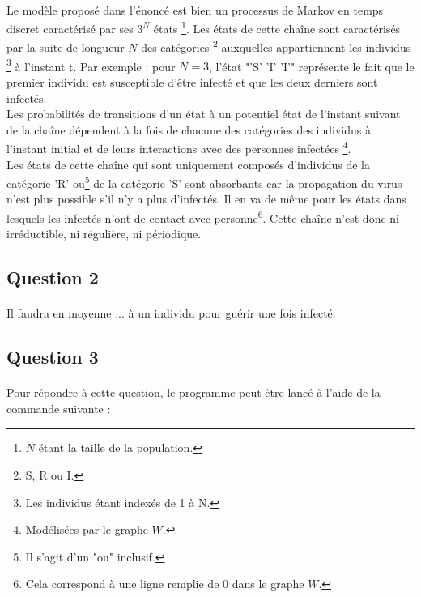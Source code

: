 \documentclass[a4paper, 12pt, oneside]{article}
\begin{document}
\paragraph{}Le modèle proposé dans l'énoncé est bien un processus de Markov en temps discret caractérisé par ses $3^N$ états \footnote{$N$ étant la taille de la population.}. Les états de cette chaîne sont caractérisés par la suite de longueur $N$ des catégories \footnote{S, R ou I.} auxquelles appartiennent les individus \footnote{Les individus étant indexés de 1 à N.} à l'instant t. Par exemple : pour $N = 3$, l'état "'S' 'I' 'I'" représente le fait que le premier individu est susceptible d'être infecté et que les deux derniers sont infectés.\\
\indent Les probabilités de transitions d'un état à un potentiel état de l'instant suivant de la chaîne dépendent à la fois de chacune des catégories des individus à l'instant initial et de leurs interactions avec des personnes infectées \footnote{Modélisées par le graphe $W$.}.\\
\indent Les états de cette chaîne qui sont uniquement composés d'individus de la catégorie 'R' ou\footnote{Il s'agit d'un "ou" inclusif.} de la catégorie 'S' sont absorbants car la propagation du virus n'est plus possible s'il n'y a plus d'infectés. Il en va de même pour les états dans lesquels les infectés n'ont de contact avec personne\footnote{Cela correspond à une ligne remplie de 0 dans le graphe $W$.}. Cette chaîne n'est donc ni irréductible, ni régulière, ni périodique.

\subsection{Question 2}

\paragraph{}Il faudra en moyenne ... à un individu pour guérir une fois infecté.

\subsection{Question 3}

\paragraph{}Pour répondre à cette question, le programme peut-être lancé à l'aide de la commande suivante :
\end{document}
